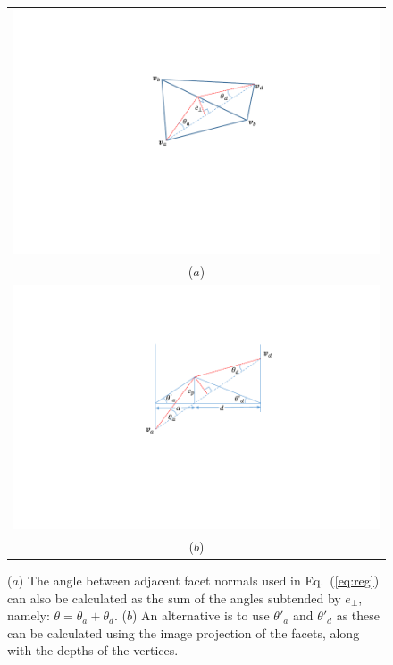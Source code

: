 \begin{figure}
\begin{center}
\begin{tabular}{c}
   \includegraphics[trim=140 110 140 70,clip,width=0.75\linewidth]{Figures/adjacentFacets} \\
   ($a$) \\
   \includegraphics[trim=140 110 140 60,clip,width=0.75\linewidth]{Figures/adjacentApprox} \\
   ($b$) \\
\end{tabular}
\end{center}
   \caption{($a$) The angle between adjacent facet normals used in Eq.~(\ref{eq:reg}) can also be calculated as the sum of the angles subtended by $e_\perp$, namely: $\theta = \theta_a+\theta_d$. ($b$) An alternative is to use $\theta'_a$  and $\theta'_d$ as these can be calculated using the image projection of the facets, along with the depths of the vertices. }
\label{fig:regularization}
\end{figure}

